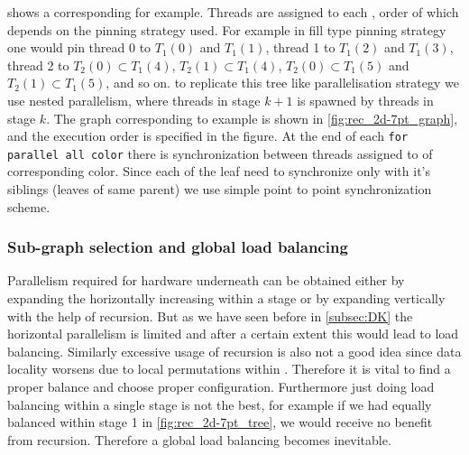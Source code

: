   shows a \levelTree corresponding for \STEX example. Threads are assigned to each \levelGroup, order of which depends on the pinning strategy used. For example in fill type pinning strategy one would pin thread 0 to $T_1(0)$ and $T_1(1)$, thread 1 to $T_1(2)$ and $T_1(3)$, thread 2 to $T_2(0)  \subset T_1(4)$, $T_2(1) \subset T_1(4)$, $T_2(0)  \subset T_1(5)$ and $T_2(1) \subset T_1(5)$, and so on. \Inorder to replicate this tree like parallelisation strategy we use nested parallelism, where threads in stage $k+1$ is spawned by threads in stage $k$. The graph corresponding to \STEX example is shown in \cref{fig:rec_2d-7pt_graph}, and the execution order is specified in the figure.  At the end of each {\tt for parallel all color} there is synchronization between threads assigned to \levelGroup of corresponding color. Since each of the leaf need to synchronize only with it's siblings (leaves of same parent)  we use simple point to point synchronization scheme. 

\subsubsection{Sub-graph selection and global load balancing} \label{subsec:subgraph_selection}
Parallelism required for hardware underneath can be obtained either by expanding the \levelTree horizontally \ie increasing \levelGroups within a stage or by expanding \levelTree vertically with the help of recursion. But as we have seen before in \cref{subsec:DK} the horizontal parallelism is limited and after a certain extent this would lead to load balancing. Similarly excessive usage of recursion is also not a good idea since data locality worsens due to local permutations within \subgraph. Therefore it is vital to find a proper balance and choose proper configuration. Furthermore just doing load balancing within a single stage is not the best, for example if we had equally balanced within stage 1 in \cref{fig:rec_2d-7pt_tree}, we would receive no benefit from recursion. Therefore a global load balancing becomes inevitable.

